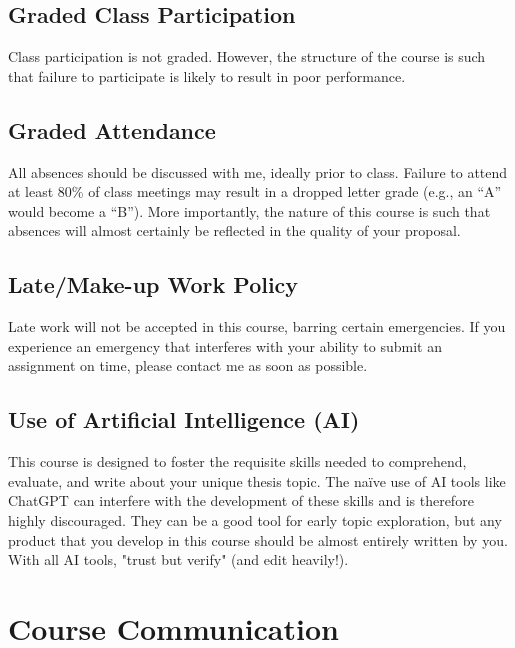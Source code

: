 \documentclass[10pt]{article}
\begin{document}
\subsection*{Graded Class Participation}
\label{sec:org40fca47}

Class participation is not graded. However, the structure of the course is such that failure to participate is likely to result in poor performance.

\subsection*{Graded Attendance}
\label{sec:orgdc5478f}

All absences should be discussed with me, ideally prior to class. Failure to attend at least 80\% of class meetings may result in a dropped letter grade (e.g., an “A” would become a “B”). More importantly, the nature of this course is such that absences will almost certainly be reflected in the quality of your proposal.

\subsection*{Late/Make-up Work Policy}
\label{sec:org04194d4}

Late work will not be accepted in this course, barring certain emergencies. If you experience an emergency that interferes with your ability to submit an assignment on time, please contact me as soon as possible.

\subsection*{Use of Artificial Intelligence (AI)}
\label{sec:orgd18f363}

This course is designed to foster the requisite skills needed to comprehend, evaluate, and write about your unique thesis topic. The naïve use of AI tools like ChatGPT can interfere with the development of these skills and is therefore highly discouraged. They can be a good tool for early topic exploration, but any product that you develop in this course should be almost entirely written by you. With all AI tools, "trust but verify" (and edit heavily!).

\section*{Course Communication}
\label{sec:org7aa06c7}
\end{document}

